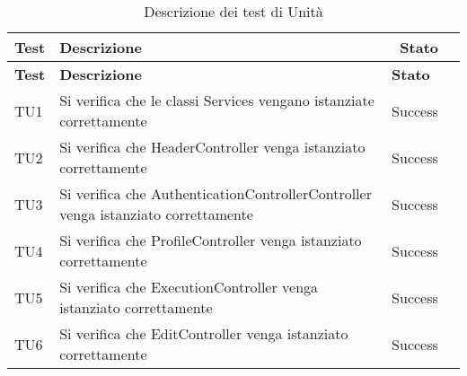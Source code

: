 	
	\begin{longtable} [c]{| p{2cm} | p{6cm} |p{3cm} | p{2cm} |}
			\caption{Descrizione dei test di Unità \label{tab:verTestUnit}}\\
		 \hline
		 \textbf{Test} & \textbf{Descrizione} & \ \textbf{Stato} \\
		 \hline
		 \endfirsthead
		 \hline
		 \textbf{Test} & \textbf{Descrizione} & \textbf{Stato} \\
		 \hline
			\endhead
		 \hline
		 \endfoot
		 \hline
		 \endlastfoot
          TU1 & Si verifica che le classi Services vengano istanziate correttamente & Success \\
          \hline
          TU2 & Si verifica che HeaderController venga istanziato correttamente & Success \\
          \hline 
          TU3 & Si verifica che AuthenticationControllerController venga istanziato correttamente & Success\\
          \hline
          TU4 & Si verifica che ProfileController venga istanziato correttamente & Success \\
          \hline
          TU5 & Si verifica che ExecutionController venga istanziato correttamente & Success \\
          \hline
          TU6 & Si verifica che EditController venga istanziato correttamente & Success \\
		\end{longtable}		
